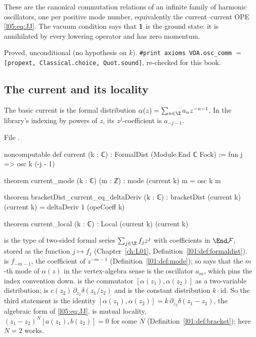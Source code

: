 \begin{physics}
These are the canonical commutation relations of an infinite family of harmonic oscillators, one per
positive mode number, equivalently the current--current OPE \eqref{l05:eq:JJ}. The vacuum condition says
that $\mathbf{1}$ is the ground state: it is annihilated by every lowering operator and has zero momentum.
\end{physics}

\begin{status}
Proved, unconditional (no hypothesis on $k$). \texttt{\#print axioms VOA.osc\_comm} $=$
\texttt{[propext, Classical.choice, Quot.sound]}, re-checked for this book.
\end{status}

\subsection{The current and its locality}

\begin{definition}\label{l05:def:current}
The basic current is the formal distribution $\alpha(z)=\sum_{n\in\Z}a_nz^{-n-1}$. In the library's
indexing by powers of $z$, its $z^j$-coefficient is $a_{-j-1}$.
\end{definition}

\noindent File .
\begin{leancode}
noncomputable def current (k : ℂ) : FormalDist (Module.End ℂ Fock) := fun j => osc k (-j - 1)

theorem current_mode (k : ℂ) (m : ℤ) : mode (current k) m = osc k m

theorem bracketDist_current_eq_deltaDeriv (k : ℂ) :
    bracketDist (current k) (current k) = deltaDeriv 1 (opeCoeff k)

theorem current_local (k : ℂ) : Local (current k) (current k)
\end{leancode}

\begin{dictionary}
 is the type of two-sided formal series $\sum_{j\in\Z}f_jz^j$ with
coefficients in $\End\lfiveF$, stored as the function $j\mapsto f_j$ (Chapter~\ref{ch:L01},
Definition~\ref{l01:def:formaldist}).  is $f_{-m-1}$, the coefficient of $z^{-m-1}$
(Definition~\ref{l01:def:mode}); so  says that the $m$-th mode of $\alpha(z)$ in the
vertex-algebra sense is the oscillator $a_m$, which pins the index convention down. 
is the commutator $[\alpha(z_1),\alpha(z_2)]$ as a two-variable distribution;  is
$c(z_2)\,\partial_{z_2}\delta(z_1/z_2)$ and  is the constant distribution $k\cdot\mathrm{id}$.
So the third statement is the identity
$[\alpha(z_1),\alpha(z_2)]=k\,\partial_{z_2}\delta(z_1-z_2)$, the algebraic form of \eqref{l05:eq:JJ}.
 is mutual locality, $(z_1-z_2)^N[a(z_1),b(z_2)]=0$ for some $N$
(Definition~\ref{l01:def:bracket}); here $N=2$ works.
\end{dictionary}

